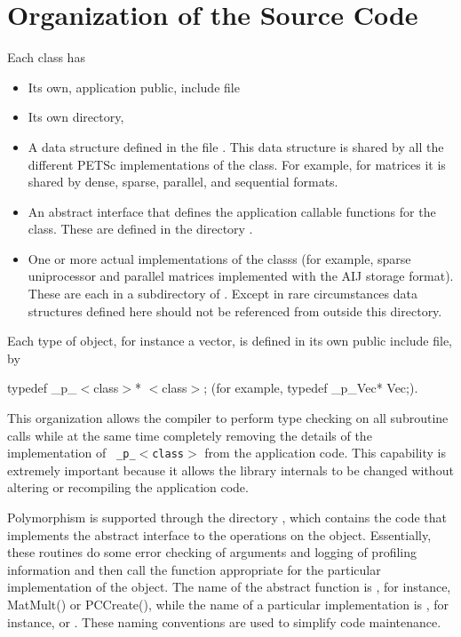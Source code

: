 \documentclass[twoside,12pt]{../sty/report_petsc}
\begin{document}
\section{Organization of the Source Code}

Each class has
\begin{itemize}
\item Its own, application public, include file  
\item Its own directory, 
\item A data structure defined in  the file
      .
      This data structure is shared by all the different PETSc implementations of the 
      class. For example, for matrices it is shared by dense,
      sparse, parallel, and sequential formats.
\item An abstract interface that defines the application callable 
      functions for the class. These are defined in the directory
      .
\item One or more actual implementations of the classs (for example,
      sparse uniprocessor and parallel matrices implemented with the AIJ storage format).
      These are each in a subdirectory of 
      \break {}. Except in rare
      circumstances data 
      structures defined here should not be referenced from outside this 
      directory.
\end{itemize}

Each type of object, for instance a vector, is defined in its own
public include file, by 
\begin{tabbing}
   typedef \_p\_$<$class$>$* $<$class$>$; (for example, typedef \_p\_Vec* Vec;).
\end{tabbing}
  This organization
allows the compiler to perform type checking on all subroutine calls
while at the same time
completely removing the details of the implementation of {\tt
\_p\_$<$class$>$} from the application code.  This capability is extremely important
because it allows the library internals to be changed
without altering or recompiling the application code.

Polymorphism is supported through the directory 
,
which contains the code that implements the abstract interface to the
operations on the object.  Essentially, these routines do some error
checking of arguments and logging of profiling information 
and then call the function appropriate for the
particular implementation of the object. The name of the abstract
function is , for instance, MatMult() or PCCreate(), while
the name of a particular implementation is 
, for instance, 
 or . These naming
conventions are used to simplify code maintenance.
\end{document}
